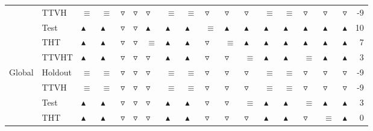 \begin{table}
\begin{tabular}{lllllllllllllllllr}
       & TTVH &          $\equiv$ &          $\equiv$ &  $\triangledown$ &   $\triangledown$ &   $\triangledown$ &          $\equiv$ &          $\equiv$ &   $\triangledown$ &   $\triangledown$ &   $\triangledown$ &          $\equiv$ &          $\equiv$ &   $\triangledown$ &   $\triangledown$ &   $\triangledown$ &       -9 \\
       & Test &  $\blacktriangle$ &  $\blacktriangle$ &  $\triangledown$ &   $\triangledown$ &  $\blacktriangle$ &  $\blacktriangle$ &  $\blacktriangle$ &          $\equiv$ &  $\blacktriangle$ &  $\blacktriangle$ &  $\blacktriangle$ &  $\blacktriangle$ &  $\blacktriangle$ &  $\blacktriangle$ &  $\blacktriangle$ &       10 \\
       & THT &  $\blacktriangle$ &  $\blacktriangle$ &  $\triangledown$ &   $\triangledown$ &          $\equiv$ &  $\blacktriangle$ &  $\blacktriangle$ &   $\triangledown$ &          $\equiv$ &  $\blacktriangle$ &  $\blacktriangle$ &  $\blacktriangle$ &  $\blacktriangle$ &  $\blacktriangle$ &  $\blacktriangle$ &        7 \\
       & TTVHT &  $\blacktriangle$ &  $\blacktriangle$ &  $\triangledown$ &   $\triangledown$ &   $\triangledown$ &  $\blacktriangle$ &  $\blacktriangle$ &   $\triangledown$ &   $\triangledown$ &          $\equiv$ &  $\blacktriangle$ &  $\blacktriangle$ &          $\equiv$ &  $\blacktriangle$ &  $\blacktriangle$ &        3 \\
Global & Holdout &          $\equiv$ &          $\equiv$ &  $\triangledown$ &   $\triangledown$ &   $\triangledown$ &          $\equiv$ &          $\equiv$ &   $\triangledown$ &   $\triangledown$ &   $\triangledown$ &          $\equiv$ &          $\equiv$ &   $\triangledown$ &   $\triangledown$ &   $\triangledown$ &       -9 \\
       & TTVH &          $\equiv$ &          $\equiv$ &  $\triangledown$ &   $\triangledown$ &   $\triangledown$ &          $\equiv$ &          $\equiv$ &   $\triangledown$ &   $\triangledown$ &   $\triangledown$ &          $\equiv$ &          $\equiv$ &   $\triangledown$ &   $\triangledown$ &   $\triangledown$ &       -9 \\
       & Test &  $\blacktriangle$ &  $\blacktriangle$ &  $\triangledown$ &   $\triangledown$ &   $\triangledown$ &  $\blacktriangle$ &  $\blacktriangle$ &   $\triangledown$ &   $\triangledown$ &          $\equiv$ &  $\blacktriangle$ &  $\blacktriangle$ &          $\equiv$ &  $\blacktriangle$ &  $\blacktriangle$ &        3 \\
       & THT &  $\blacktriangle$ &  $\blacktriangle$ &  $\triangledown$ &   $\triangledown$ &   $\triangledown$ &  $\blacktriangle$ &  $\blacktriangle$ &   $\triangledown$ &   $\triangledown$ &   $\triangledown$ &  $\blacktriangle$ &  $\blacktriangle$ &   $\triangledown$ &          $\equiv$ &  $\blacktriangle$ &        0 \\

\end{tabular}
\end{table}
